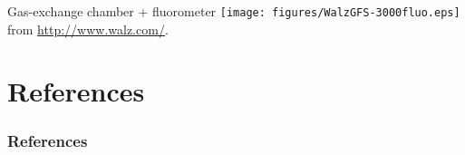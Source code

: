\documentclass[10pt]{beamer}
\begin{document}
\begin{frame}{Gas-exchange chamber + fluorometer}
    \centering
    \texttt{[image: figures/WalzGFS-3000fluo.eps]}\\
    {\small from \url{http://www.walz.com/}.}
\end{frame}

  \section*{References}
  \begin{frame}[t,allowframebreaks]
    \frametitle{References}
    \printbibliography
  \end{frame}
\end{document}
